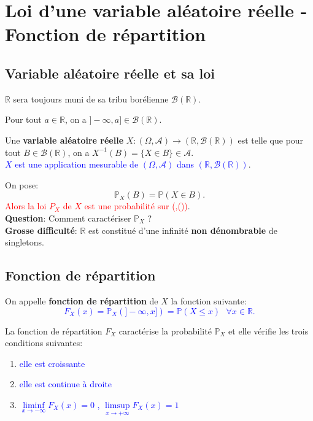\section{Loi d’une variable aléatoire réelle - Fonction de répartition}

\subsection{Variable aléatoire réelle et sa loi}

$\mathbb{R}$ sera toujours muni de sa tribu borélienne $\mathscr{B}(\mathbb{R})$.

\theoremstyle{rappel}
\begin{rappel}
    Pour tout $a\in \mathbb{R}$, on a $]-\infty,a]\in \mathscr{B}(\mathbb{R})$.
\end{rappel}
\theoremstyle{definition}
\begin{definition}
    Une \textbf{variable aléatoire réelle} $X: (\Omega,\mathscr{A})\to (\mathbb{R},\mathscr{B}(\mathbb{R}))$ est telle que
    pour tout $B\in\mathscr{B}(\mathbb{R})$, on a $X^{-1}(B)=\{X\in B\}\in\mathscr{A}$.\\
\textcolor{blue}{$X$ est une application mesurable de $(\Omega,\mathscr{A})$ dans $(\mathbb{R},\mathscr{B}(\mathbb{R}))$}.
\end{definition}
On pose: $$\mathbb{P}_X(B) = \mathbb{P}(X \in B).$$
\textcolor{red}{Alors la loi $P_X$ de $X$ est une probabilité sur (,())}.\\
\textbf{Question}: Comment caractériser $\mathbb{P}_X$ ?\\
\textbf{Grosse difficulté}: $\mathbb{R}$ est constitué d’une infinité \textbf{non dénombrable} de  singletons.

\subsection{Fonction de répartition}
\theoremstyle{definition}
\begin{definition}
    On appelle \textbf{fonction de répartition} de $X$ la fonction suivante:
\textcolor{blue}{$$F_X(x)=\mathbb{P}_X(]-\infty,x])=\mathbb{P}(X\leq x) \mbox{   } \forall x\in\mathbb{R}. $$}
\end{definition}

\theoremstyle{proposition}
\begin{proposition}
La fonction de répartition $F_X$ caractérise la probabilité $\mathbb{P}_X$ et elle vérifie
les trois conditions suivantes:

\begin{enumerate}
\item \textcolor{blue}{elle est croissante}\label{prop:prop1.1}
\item \textcolor{blue}{elle est continue à droite}\label{prop:prop1.2}
\item \textcolor{blue}{$\liminf\limits_{x\rightarrow-\infty}F_X(x)=0$ ,
$\limsup\limits_{x\rightarrow+\infty}F_X(x)=1$}\label{prop:prop1.3}
\end{enumerate}
\end{proposition}

